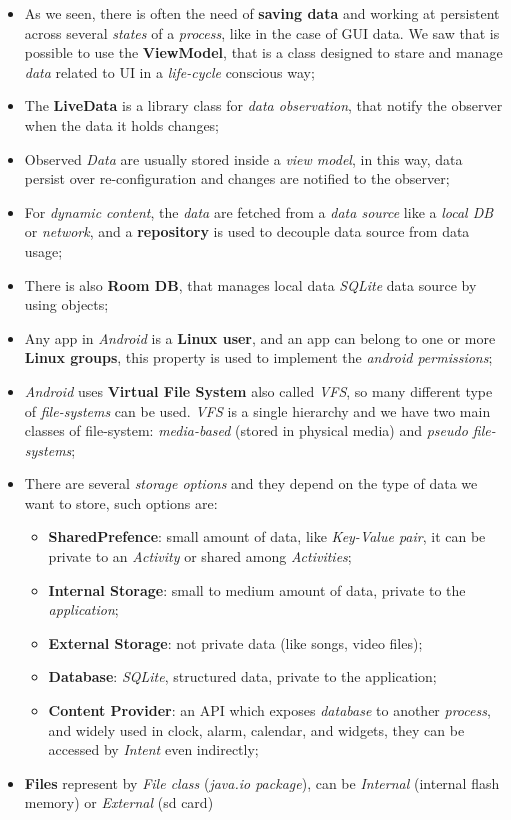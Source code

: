 \documentclass{article}
\begin{document}
\begin{itemize}
\item As we seen, there is often the need of \textbf{saving data} and working at persistent across several \emph{states} of a \emph{process}, like in the case of GUI data. We saw that is possible to use the \textbf{ViewModel}, that is a class designed to stare and manage \emph{data} related to UI in a \emph{life-cycle} conscious way;
\item The \textbf{LiveData} is a library class for \emph{data observation}, that notify the observer when the data it holds changes;
\item Observed \emph{Data} are usually stored inside a \emph{view model}, in this way, data persist over re-configuration and changes are notified to the observer;
\item For \emph{dynamic content}, the \emph{data} are fetched from a \emph{data source} like a \emph{local DB} or \emph{network}, and a \textbf{repository} is used to decouple data source from data usage;
\item There is also \textbf{Room DB}, that manages local data \emph{SQLite} data source by using objects;
\item Any app in \emph{Android} is a \textbf{Linux user}, and an app can belong to one or more \textbf{Linux groups}, this property is used to implement the \emph{android permissions};
\item \emph{Android} uses \textbf{Virtual File System} also called \emph{VFS}, so many different type of \emph{file-systems} can be used. \emph{VFS} is a single hierarchy and we have two main classes of file-system: \emph{media-based} (stored in physical media) and \emph{pseudo file-systems};
\item There are several \emph{storage options} and they depend on the type of data we want to store, such options are:
\begin{itemize}
\item \textbf{SharedPrefence}: small amount of data, like \emph{Key-Value pair}, it can be private to an \emph{Activity} or shared among \emph{Activities};
\item \textbf{Internal Storage}: small to medium amount of data, private to the \emph{application};
\item \textbf{External Storage}: not private data (like songs, video files);
\item \textbf{Database}: \emph{SQLite}, structured data, private to the application;
\item \textbf{Content Provider}: an API which exposes \emph{database} to another \emph{process}, and widely used in clock, alarm, calendar, and widgets, they can be accessed by \emph{Intent} even indirectly;
\end{itemize}
\item \textbf{Files} represent by \emph{File class} (\emph{java.io package}), can be \emph{Internal} (internal flash memory) or \emph{External} (sd card) 
\end{itemize}
\end{document}

